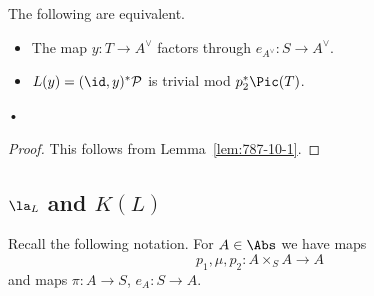 \begin{cor}
The following are equivalent.
\begin{itemize}
\item
The map $y:T\to A^{\vee}$  factors through $e_{A^{\vee}}:S\to A^{\vee}$.
\item 
$L(y)=(\id,y)^*\cal P$ is trivial mod $p_2^*\Pic(T)$.
\end{itemize}•
\end{cor}
\begin{proof}
This follows from Lemma~\ref{lem:787-10-1}.
\end{proof}
\subsection{$\la_L$ and $K(L)$}
Recall the following notation. For $A\in \Abs$ we have maps
\[
p_1,\mu,p_2:A\times_SA\to A
\]
and maps $\pi:A\to S$, $e_A:S\to A$.

